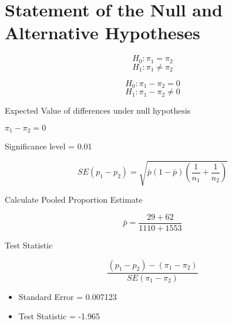 \section{Statement of the Null and Alternative Hypotheses}
\[H_0 : \pi_1 = \pi_2\]
\[H_1 : \pi_1 \neq \pi_2\]

\[H_0 : \pi_1 - \pi_2 = 0\]
\[H_1 : \pi_1 -  \pi_2 \neq 0\]

Expected Value of differences under null hypothesis

$\pi_1 - \pi_2 = 0$


Significance level = 0.01

\[SE(p_1 - p_2) = \sqrt{\bar{p}(1-\bar{p})\left( \frac{1}{n_1} + \frac{1}{n_2} \right)  }\]

Calculate Pooled Proportion Estimate

\[ \bar{p} = \frac{29 + 62}{1110 + 1553} \]

Test Statistic

\[ \frac{(p_1 - p_2) - (\pi_1 - \pi_2)}{SE(\pi_1 - \pi_2)} \]


\begin{itemize}
	\item Standard Error = 0.007123
	\item Test Statistic = -1.965
\end{itemize}



